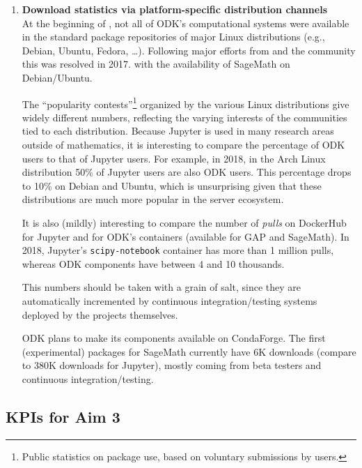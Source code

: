 \begin{enumerate}

\item \textbf{Download statistics via platform-specific distribution
    channels}\\
  At the beginning of \ODK, not all of ODK's computational systems
  were available in the standard package repositories of major Linux
  distributions (e.g., Debian, Ubuntu, Fedora, \dots). Following major
  efforts from \ODK and the community this was resolved in 2017. with
  the availability of SageMath on Debian/Ubuntu.

  \noindent
  The ``popularity contests''\footnote{Public statistics on package
    use, based on voluntary submissions by users.} organized by the
  various Linux distributions give widely different numbers,
  reflecting the varying interests of the communities tied to each
  distribution. Because Jupyter is used in many research areas outside
  of mathematics, it is interesting to compare the percentage of ODK
  users to that of Jupyter users. For example, in 2018, in the Arch
  Linux distribution 50\% of Jupyter users are also ODK users. This
  percentage drops to 10\% on Debian and Ubuntu, which is unsurprising
  given that these distributions are much more popular in the server
  ecosystem.

  \noindent
  It is also (mildly) interesting to compare the number of
  \emph{pulls} on DockerHub for Jupyter and for ODK's containers
  (available for GAP and SageMath). In 2018, Jupyter's
  \texttt{scipy-notebook} container has more than 1 million pulls,
  whereas ODK components have between 4 and 10 thousands.

  \noindent
  This numbers should be taken with a grain of salt, since they are
  automatically incremented by continuous integration/testing systems
  deployed by the projects themselves.

  \noindent
  ODK plans to make its components available on CondaForge. The first
  (experimental) packages for SageMath currently have 6K downloads
  (compare to 380K downloads for Jupyter), mostly coming from beta
  testers and continuous integration/testing.
\end{enumerate}

\subsection{KPIs for Aim 3}


